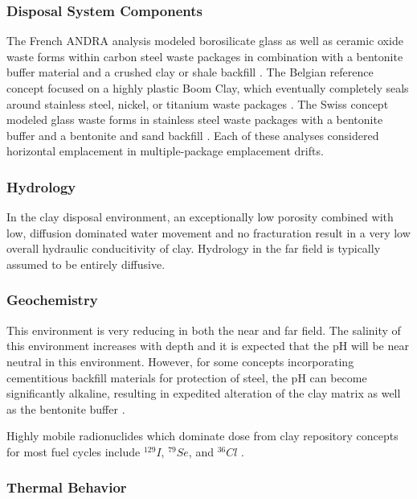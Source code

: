 

\subsubsection{Disposal System Components}

The French \gls{ANDRA}  analysis modeled borosilicate glass as well as ceramic 
oxide waste forms within carbon steel waste packages in combination with a bentonite 
buffer material and a crushed clay or shale backfill \cite{andra_argile:_2005}.
The Belgian reference concept focused on a highly plastic Boom Clay, which 
eventually completely seals around stainless steel, nickel, or titanium waste 
packages \cite{ondraf-niras_technical_2001}.  The Swiss concept modeled glass 
waste forms in stainless steel waste packages with a bentonite buffer and a 
bentonite and sand backfill
\cite{johnson_calculations_2002}. Each of these analyses considered 
horizontal emplacement in multiple-package emplacement drifts. 


\subsubsection{Hydrology}

In the clay disposal environment, an exceptionally low porosity combined with 
low, diffusion dominated water movement and no fracturation result in a very low 
overall hydraulic conducitivity of clay. Hydrology in the far field is 
typically assumed to be entirely diffusive.

\subsubsection{Geochemistry}

This environment is very reducing in both the near and far field.
The salinity of this environment increases with depth and it is 
expected that the pH will be near neutral in this environment. However, for 
some concepts incorporating cementitious backfill materials for protection 
of steel, the pH can become significantly alkaline, resulting in 
expedited alteration of the clay matrix as well as the bentonite buffer 
\cite{andra_argile:_2005}.

Highly mobile radionuclides which dominate dose from clay repository concepts 
for most fuel cycles include $^{129}I$, $^{79}Se$, and $^{36}Cl$ 
\cite{swift_applying_2010}.

\subsubsection{Thermal Behavior}
\label{subsec:claythermal}


